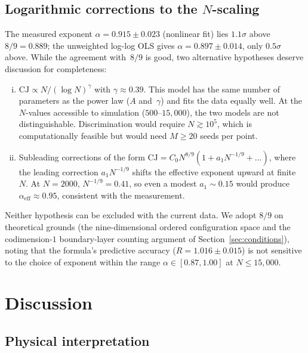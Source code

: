 \documentclass[12pt,a4paper]{article}
\theoremstyle{plain}
\theoremstyle{definition}
\theoremstyle{remark}
\newcommand{\CJ}{\mathrm{CJ}}
\begin{document}
\subsection{Logarithmic corrections to the $N$-scaling}
\label{sec:logcorr}

The measured exponent $\alpha = 0.915 \pm 0.023$ (nonlinear fit)
lies $1.1\sigma$ above $8/9 = 0.889$; the unweighted log-log OLS
gives $\alpha = 0.897 \pm 0.014$, only $0.5\sigma$ above.  While
the agreement with~$8/9$ is good, two alternative hypotheses
deserve discussion for completeness:
\begin{enumerate}[(i)]
\item $\CJ \propto N / (\log N)^\gamma$ with $\gamma \approx 0.39$.
  This model has the same number of parameters as the power law
  ($A$ and~$\gamma$) and fits the data equally well.  At the
  $N$-values accessible to simulation ($500$--$15{,}000$), the two
  models are not distinguishable.  Discrimination would require
  $N \gtrsim 10^5$, which is computationally feasible but would
  need $M \geq 20$ seeds per point.
\item Subleading corrections of the form
  $\CJ = C_0 N^{8/9}(1 + a_1 N^{-1/9} + \ldots)$, where the
  leading correction $a_1 N^{-1/9}$ shifts the effective exponent
  upward at finite~$N$.  At $N = 2000$, $N^{-1/9} = 0.41$, so
  even a modest $a_1 \sim 0.15$ would produce $\alpha_{\mathrm{eff}}
  \approx 0.95$, consistent with the measurement.
\end{enumerate}
Neither hypothesis can be excluded with the current data.  We
adopt $8/9$ on theoretical grounds (the nine-dimensional ordered
configuration space and the codimension-$1$ boundary-layer
counting argument of Section~\ref{sec:conditions}), noting that
the formula's predictive accuracy ($R = 1.016 \pm 0.015$) is
not sensitive to the choice of exponent within the range
$\alpha \in [0.87, 1.00]$ at $N \leq 15{,}000$.

\section{Discussion}
\label{sec:discussion}

\subsection{Physical interpretation}
\end{document}
